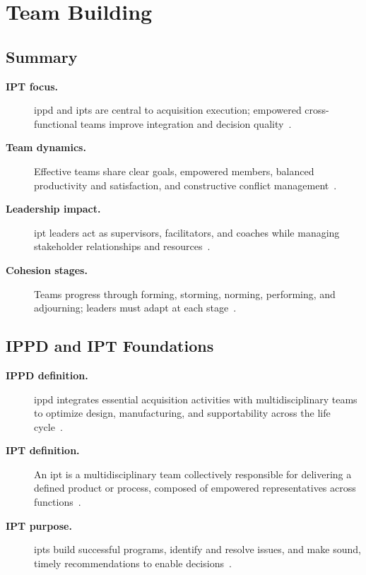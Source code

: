 \documentclass[../main.tex]{subfiles}
\begin{document}
\section{Team Building}

\subsection{Summary}
\begin{description}
  \item[\textbf{IPT focus.}] \ac{ippd} and \acp{ipt} are central to acquisition execution; empowered cross-functional teams improve integration and decision quality~\autocite{edo-5-1-5-team-building-2025}.
  \item[\textbf{Team dynamics.}] Effective teams share clear goals, empowered members, balanced productivity and satisfaction, and constructive conflict management~\autocite{edo-5-1-5-team-building-2025}.
  \item[\textbf{Leadership impact.}] \ac{ipt} leaders act as supervisors, facilitators, and coaches while managing stakeholder relationships and resources~\autocite{edo-5-1-5-team-building-2025}.
  \item[\textbf{Cohesion stages.}] Teams progress through forming, storming, norming, performing, and adjourning; leaders must adapt at each stage~\autocite{edo-5-1-5-team-building-2025}.
\end{description}

\subsection{IPPD and IPT Foundations}
\begin{description}
  \item[\textbf{IPPD definition.}] \ac{ippd} integrates essential acquisition activities with multidisciplinary teams to optimize design, manufacturing, and supportability across the life cycle~\autocite{edo-5-1-5-team-building-2025}.
  \item[\textbf{IPT definition.}] An \ac{ipt} is a multidisciplinary team collectively responsible for delivering a defined product or process, composed of empowered representatives across functions~\autocite{edo-5-1-5-team-building-2025}.
  \item[\textbf{IPT purpose.}] \acp{ipt} build successful programs, identify and resolve issues, and make sound, timely recommendations to enable decisions~\autocite{edo-5-1-5-team-building-2025}.
\end{description}
\end{document}
